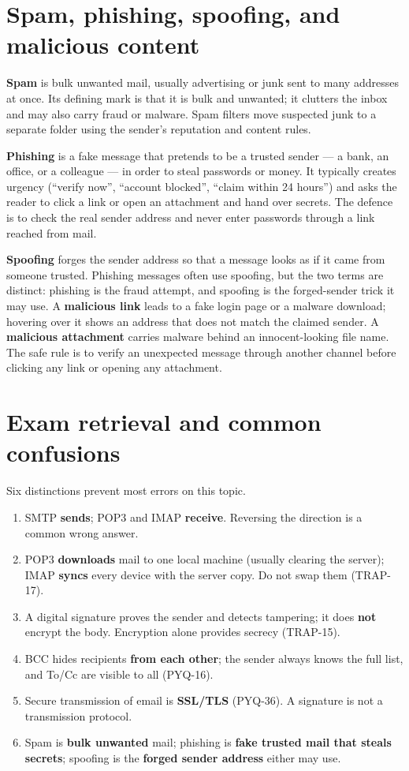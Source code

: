 \section{Spam, phishing, spoofing, and malicious content}
\textbf{Spam} is bulk unwanted mail, usually advertising or junk sent to
many addresses at once. Its defining mark is that it is bulk and unwanted;
it clutters the inbox and may also carry fraud or malware. Spam filters move
suspected junk to a separate folder using the sender's reputation and
content rules.

\textbf{Phishing} is a fake message that pretends to be a trusted sender
--- a bank, an office, or a colleague --- in order to steal passwords or
money. It typically creates urgency (``verify now'', ``account blocked'',
``claim within 24 hours'') and asks the reader to click a link or open an
attachment and hand over secrets. The defence is to check the real sender
address and never enter passwords through a link reached from mail.

\textbf{Spoofing} forges the sender address so that a message looks as if
it came from someone trusted. Phishing messages often use spoofing, but
the two terms are distinct: phishing is the fraud attempt, and spoofing is
the forged-sender trick it may use. A \textbf{malicious link} leads to a
fake login page or a malware download; hovering over it shows an address
that does not match the claimed sender. A \textbf{malicious attachment}
carries malware behind an innocent-looking file name. The safe rule is to
verify an unexpected message through another channel before clicking any
link or opening any attachment.

\section{Exam retrieval and common confusions}
Six distinctions prevent most errors on this topic.
\begin{enumerate}
  \item SMTP \textbf{sends}; POP3 and IMAP \textbf{receive}. Reversing the
    direction is a common wrong answer.
  \item POP3 \textbf{downloads} mail to one local machine (usually clearing
    the server); IMAP \textbf{syncs} every device with the server copy.
    Do not swap them (TRAP-17).
  \item A digital signature proves the sender and detects tampering; it
    does \textbf{not} encrypt the body. Encryption alone provides secrecy
    (TRAP-15).
  \item BCC hides recipients \textbf{from each other}; the sender always
    knows the full list, and To/Cc are visible to all (PYQ-16).
  \item Secure transmission of email is \textbf{SSL/TLS} (PYQ-36). A
    signature is not a transmission protocol.
  \item Spam is \textbf{bulk unwanted} mail; phishing is \textbf{fake
    trusted mail that steals secrets}; spoofing is the \textbf{forged
    sender address} either may use.
\end{enumerate}

